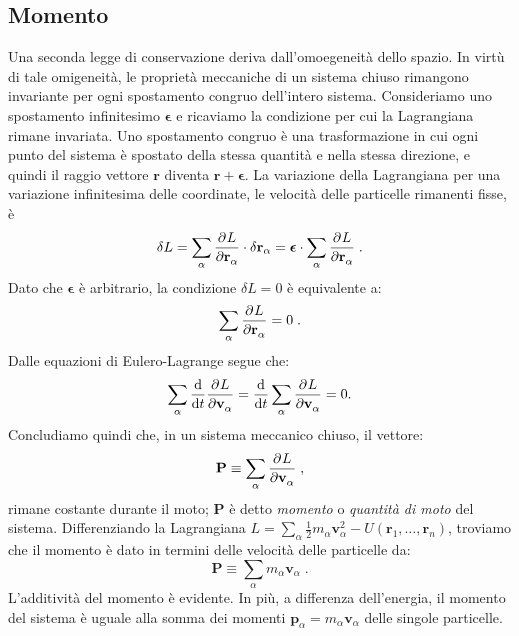 \subsection{Momento}
Una seconda legge di conservazione deriva dall'omoegeneità dello spazio. In virtù di tale omigeneità, le proprietà meccaniche di un sistema chiuso rimangono invariante per ogni spostamento congruo dell'intero sistema. Consideriamo uno spostamento infinitesimo $\boldsymbol{\epsilon}$ e ricaviamo la condizione per cui la Lagrangiana rimane invariata. Uno spostamento congruo è una trasformazione in cui ogni punto del sistema è spostato della stessa quantità e nella stessa direzione, e quindi il raggio vettore $\mathbf{r}$ diventa $\mathbf{r}+\boldsymbol{\epsilon}$. La variazione della Lagrangiana per una variazione infinitesima delle coordinate, le velocità delle particelle rimanenti fisse, è
\begin{equation}
\delta L=\sum_{\alpha} \pdev{L}{\mathbf{r}_{\alpha}}\cdot\delta\mathbf{r}_{\alpha}=\boldsymbol{\epsilon}\cdot \sum_{\alpha}\pdev{L}{\mathbf{r}_{\alpha}}\;.
\end{equation}
Dato che $\boldsymbol{\epsilon}$ è arbitrario, la condizione $\delta L=0$ è equivalente a:
\begin{equation}
\sum_{\alpha}\pdev{L}{\mathbf{r}_{\alpha}}=0\;. \label{sec3_dldra}
\end{equation}
Dalle equazioni di Eulero-Lagrange segue che:
\begin{equation}
\sum_{\alpha}\frac{\diff}{\diff[t]}\pdev{L}{\mathbf{v}_{\alpha}}=\frac{\diff}{\diff[t]}\sum_{\alpha}\pdev{L}{\mathbf{v}_{\alpha}}=0.
\end{equation}
Concludiamo quindi che, in un sistema meccanico chiuso, il vettore:
\begin{equation}
\mathbf{P}\equiv \sum_{\alpha}\pdev{L}{\mathbf{v}_{\alpha}}\;,
\end{equation}
rimane costante durante il moto; $\mathbf{P}$ è detto \textit{momento} o \textit{quantità di moto} del sistema. Differenziando la Lagrangiana $L=\sum_{\alpha}\frac{1}{2}m_{\alpha}\mathbf{v}_{\alpha}^2-U(\mathbf{r}_1,\ldots,\mathbf{r}_n)$, troviamo che il momento è dato in termini delle velocità delle particelle da:
 \begin{equation}
 \mathbf{P}\equiv \sum_{\alpha}m_{\alpha}\mathbf{v}_{\alpha}\;.
 \end{equation}
L'additività del momento è evidente. In più, a differenza dell'energia, il momento del sistema è uguale alla somma dei momenti $\mathbf{p}_{\alpha}=m_{\alpha}\mathbf{v}_{\alpha}$ delle singole particelle. \\
